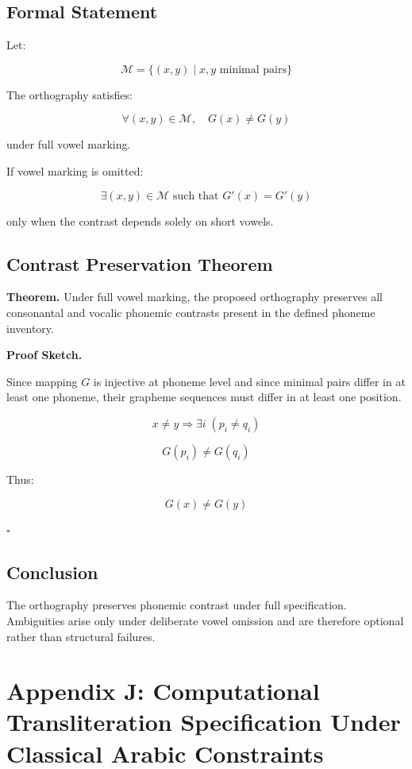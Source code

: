 \documentclass[12pt]{article}
\begin{document}
\subsection{Formal Statement}

Let:

\[
\mathcal{M} = \{(x,y) \mid x,y \text{ minimal pairs}\}
\]

The orthography satisfies:

\[
\forall (x,y) \in \mathcal{M}, \quad G(x) \neq G(y)
\]

under full vowel marking.

If vowel marking is omitted:

\[
\exists (x,y) \in \mathcal{M} \text{ such that } G'(x) = G'(y)
\]

only when the contrast depends solely on short vowels.

\subsection{Contrast Preservation Theorem}

\textbf{Theorem.}  
Under full vowel marking, the proposed orthography preserves all consonantal and vocalic phonemic contrasts present in the defined phoneme inventory.

\textbf{Proof Sketch.}

Since mapping \( G \) is injective at phoneme level and since minimal pairs differ in at least one phoneme, their grapheme sequences must differ in at least one position.

\[
x \neq y \Rightarrow \exists i \; (p_i \neq q_i)
\]

\[
G(p_i) \neq G(q_i)
\]

Thus:

\[
G(x) \neq G(y)
\]

\hfill \( \square \)

\subsection{Conclusion}

The orthography preserves phonemic contrast under full specification. Ambiguities arise only under deliberate vowel omission and are therefore optional rather than structural failures.

\section{Appendix J: Computational Transliteration Specification Under Classical Arabic Constraints}
\end{document}
